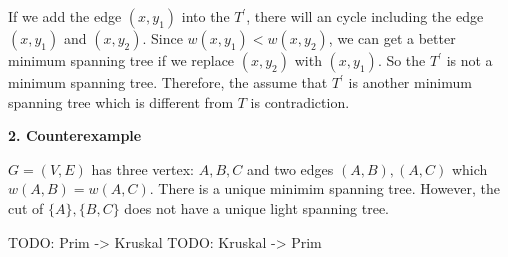If we add the edge $(x, y_1)$ into the $T^{'}$, there will an cycle including
the edge $(x, y_1)$ and $(x, y_2)$. Since $w(x, y_1) < w(x, y_2)$, we can get
a better minimum spanning tree if we replace $(x, y_2)$ with $(x, y_1)$. So the
$T^{'}$ is not a minimum spanning tree. Therefore, the assume that $T^{'}$ is
another minimum spanning tree which is different from $T$ is contradiction.

\textbf{2. Counterexample}

$G=(V, E)$ has three vertex: $A, B, C$ and two edges $(A, B), (A, C)$ which
$w(A, B) = w(A, C)$. There is a unique minimim spanning tree. However, the cut
of $\{A\}, \{B, C\}$ does not have a unique light spanning tree.





TODO: Prim -> Kruskal
TODO: Kruskal -> Prim
